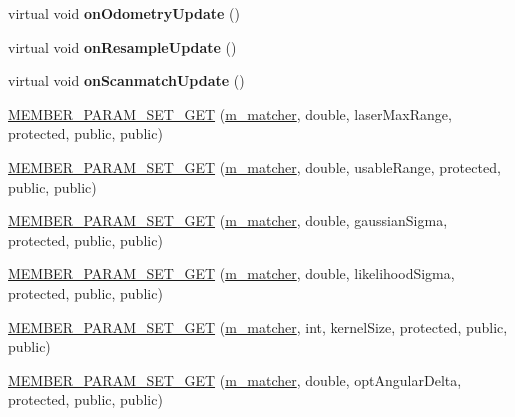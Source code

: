 \begin{DoxyCompactItemize}
virtual void {\bfseries on\+Odometry\+Update} ()
\item 
\mbox{\label{classGMapping_1_1GridSlamProcessor_ae12e8c9b89dcb7f571464f5d79010339}} 
virtual void {\bfseries on\+Resample\+Update} ()
\item 
\mbox{\label{classGMapping_1_1GridSlamProcessor_a877081a40963db2b11e90eb894ff207a}} 
virtual void {\bfseries on\+Scanmatch\+Update} ()
\item 
\hyperlink{classGMapping_1_1GridSlamProcessor_a59fd57518b8010bdf60972b239067f19}{M\+E\+M\+B\+E\+R\+\_\+\+P\+A\+R\+A\+M\+\_\+\+S\+E\+T\+\_\+\+G\+ET} (\hyperlink{classGMapping_1_1GridSlamProcessor_ac50952d259590c4aeba22eee4e6437f5}{m\+\_\+matcher}, double, laser\+Max\+Range, protected, public, public)
\item 
\hyperlink{classGMapping_1_1GridSlamProcessor_a76a51cf2adbc8b4ff976d94b1c7d6e91}{M\+E\+M\+B\+E\+R\+\_\+\+P\+A\+R\+A\+M\+\_\+\+S\+E\+T\+\_\+\+G\+ET} (\hyperlink{classGMapping_1_1GridSlamProcessor_ac50952d259590c4aeba22eee4e6437f5}{m\+\_\+matcher}, double, usable\+Range, protected, public, public)
\item 
\hyperlink{classGMapping_1_1GridSlamProcessor_a1a4b79434cb2b998ebeecdf84bec85c5}{M\+E\+M\+B\+E\+R\+\_\+\+P\+A\+R\+A\+M\+\_\+\+S\+E\+T\+\_\+\+G\+ET} (\hyperlink{classGMapping_1_1GridSlamProcessor_ac50952d259590c4aeba22eee4e6437f5}{m\+\_\+matcher}, double, gaussian\+Sigma, protected, public, public)
\item 
\hyperlink{classGMapping_1_1GridSlamProcessor_a0ca266215482753f991e702f222e5f4b}{M\+E\+M\+B\+E\+R\+\_\+\+P\+A\+R\+A\+M\+\_\+\+S\+E\+T\+\_\+\+G\+ET} (\hyperlink{classGMapping_1_1GridSlamProcessor_ac50952d259590c4aeba22eee4e6437f5}{m\+\_\+matcher}, double, likelihood\+Sigma, protected, public, public)
\item 
\hyperlink{classGMapping_1_1GridSlamProcessor_abe193f91a1ddcdf68cf65284217c64d8}{M\+E\+M\+B\+E\+R\+\_\+\+P\+A\+R\+A\+M\+\_\+\+S\+E\+T\+\_\+\+G\+ET} (\hyperlink{classGMapping_1_1GridSlamProcessor_ac50952d259590c4aeba22eee4e6437f5}{m\+\_\+matcher}, int, kernel\+Size, protected, public, public)
\item 
\hyperlink{classGMapping_1_1GridSlamProcessor_a2d7ed8bd432b4e8fd2f415536f48231d}{M\+E\+M\+B\+E\+R\+\_\+\+P\+A\+R\+A\+M\+\_\+\+S\+E\+T\+\_\+\+G\+ET} (\hyperlink{classGMapping_1_1GridSlamProcessor_ac50952d259590c4aeba22eee4e6437f5}{m\+\_\+matcher}, double, opt\+Angular\+Delta, protected, public, public)

\end{DoxyCompactItemize}
